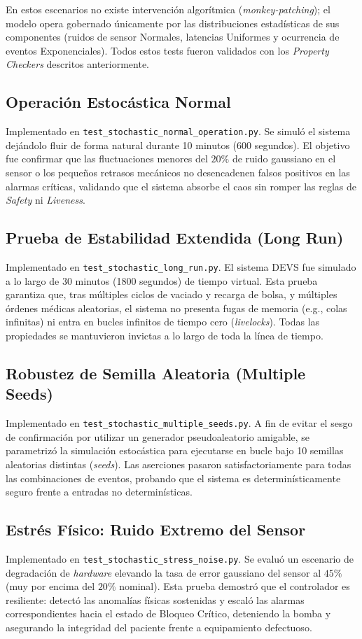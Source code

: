 En estos escenarios no existe intervención algorítmica (\textit{monkey-patching}); el modelo opera gobernado únicamente por las distribuciones estadísticas de sus componentes (ruidos de sensor Normales, latencias Uniformes y ocurrencia de eventos Exponenciales). Todos estos tests fueron validados con los \textit{Property Checkers} descritos anteriormente.

\subsection{Operación Estocástica Normal}
Implementado en \texttt{test\_stochastic\_normal\_operation.py}. Se simuló el sistema dejándolo fluir de forma natural durante 10 minutos (600 segundos). El objetivo fue confirmar que las fluctuaciones menores del $20\%$ de ruido gaussiano en el sensor o los pequeños retrasos mecánicos no desencadenen falsos positivos en las alarmas críticas, validando que el sistema absorbe el caos sin romper las reglas de \textit{Safety} ni \textit{Liveness}.

\subsection{Prueba de Estabilidad Extendida (Long Run)}
Implementado en \texttt{test\_stochastic\_long\_run.py}. El sistema DEVS fue simulado a lo largo de 30 minutos (1800 segundos) de tiempo virtual. Esta prueba garantiza que, tras múltiples ciclos de vaciado y recarga de bolsa, y múltiples órdenes médicas aleatorias, el sistema no presenta fugas de memoria (e.g., colas infinitas) ni entra en bucles infinitos de tiempo cero (\textit{livelocks}). Todas las propiedades se mantuvieron invictas a lo largo de toda la línea de tiempo.

\subsection{Robustez de Semilla Aleatoria (Multiple Seeds)}
Implementado en \texttt{test\_stochastic\_multiple\_seeds.py}. A fin de evitar el sesgo de confirmación por utilizar un generador pseudoaleatorio amigable, se parametrizó la simulación estocástica para ejecutarse en bucle bajo 10 semillas aleatorias distintas (\textit{seeds}). Las aserciones pasaron satisfactoriamente para todas las combinaciones de eventos, probando que el sistema es determinísticamente seguro frente a entradas no determinísticas.

\subsection{Estrés Físico: Ruido Extremo del Sensor}
Implementado en \texttt{test\_stochastic\_stress\_noise.py}. Se evaluó un escenario de degradación de \textit{hardware} elevando la tasa de error gaussiano del sensor al $45\%$ (muy por encima del $20\%$ nominal). Esta prueba demostró que el controlador es resiliente: detectó las anomalías físicas sostenidas y escaló las alarmas correspondientes hacia el estado de Bloqueo Crítico, deteniendo la bomba y asegurando la integridad del paciente frente a equipamiento defectuoso.

